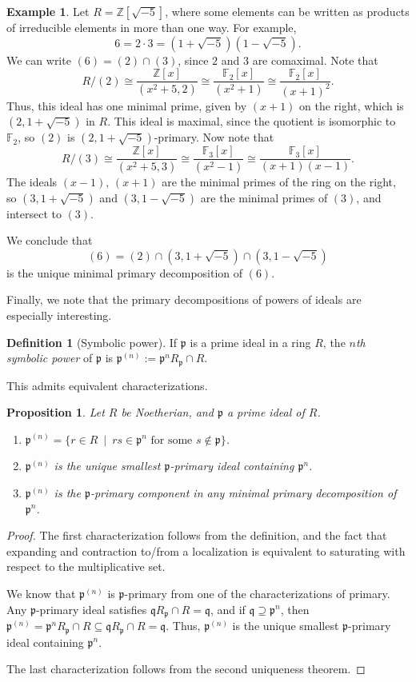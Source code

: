 \documentclass{amsart}[12pt]
\newcommand{\F}{\mathbb{F}}
\newcommand{\Z}{\mathbb{Z}}
\newcommand{\p}{{\mathfrak p}}
\newcommand{\q}{{\mathfrak q}}
\numberwithin{equation}{section}
\theoremstyle{plain} %
\newtheorem{proposition}[equation]{Proposition}
\theoremstyle{definition}
\newtheorem{definition}[equation]{Definition}
\newtheorem{example}[equation]{Example}
\theoremstyle{remark}
\begin{document}
	\begin{example}
	Let  $R=\mathbb{Z}[\sqrt{-5}]$, where some elements can be written as products of irreducible elements in more than one way. For example,
	$$6 = 2 \cdot 3 = (1 + \sqrt{-5}) (1 - \sqrt{-5}).$$
	We can write $(6) = (2) \cap (3)$, since $2$ and $3$ are comaximal. Note that 
	\[	R/(2) \cong \frac{\Z[x]}{(x^2 + 5,2)} \cong \frac{\F_2[x]}{(x^2 + 1)} \cong \frac{\F_2[x]}{(x+ 1)^2}.\]
	Thus, this ideal has one minimal prime, given by $(x+1)$ on the right, which is $(2,1+\sqrt{-5})$ in $R$. This ideal is maximal, since the quotient is isomorphic to $\F_2$, so $(2)$ is $(2,1+\sqrt{-5})$-primary.
Now note that 
\[	R/(3) \cong \frac{\Z[x]}{(x^2 + 5,3)} \cong \frac{\F_3[x]}{(x^2 - 1)} \cong \frac{\F_3[x]}{(x+ 1)(x-1)}.\]
The ideals $(x-1)$, $(x+1)$ are the minimal primes of the ring on the right, so $(3,1+\sqrt{-5})$ and $(3, 1-\sqrt{-5})$ are the minimal primes of $(3)$, and intersect to $(3)$.

We conclude that \[ (6) = (2) \cap (3,1+\sqrt{-5}) \cap (3, 1-\sqrt{-5}) \]
is the unique minimal primary decomposition of $(6)$.
	\end{example}



Finally, we note that the primary decompositions of powers of ideals are especially interesting.


\begin{definition}[Symbolic power]
	If $\p$ is a prime ideal in a ring $R$, the {\em $n$th symbolic power}\index{$\p^{(n)}$} of $\p$ is $\p^{(n)} := \p^n R_{\p} \cap R$.
\end{definition}

This admits equivalent characterizations.

\begin{proposition}
	Let $R$ be Noetherian, and $\p$ a prime ideal of $R$. 
	\begin{enumerate}
		\item $\p^{(n)}=\{ r\in R \ \mid \ rs\in \p^n \textrm{ for some }  s\notin \p \}$.
		\item $\p^{(n)}$ is the unique smallest $\p$-primary ideal containing $\p^n$.
		\item $\p^{(n)}$ is the $\p$-primary component in any minimal primary decomposition of $\p^n$.
	\end{enumerate} 
\end{proposition}

\begin{proof}
	The first characterization follows from the definition, and the fact that expanding and contraction to/from a localization is equivalent to saturating with respect to the multiplicative set.
	
	We know that $\p^{(n)}$ is $\p$-primary from one of the characterizations of primary. Any $\p$-primary ideal satisfies $\q R_{\p} \cap R = \q$, and if $\q\supseteq \p^{n}$, then $\p^{(n)} = \p^n R_{\p} \cap R \subseteq \q R_{\p} \cap R = \q$. Thus, $\p^{(n)}$ is the unique smallest $\p$-primary ideal containing $\p^n$.
	
	The last characterization follows from the second uniqueness theorem.
\end{proof}
\end{document}

